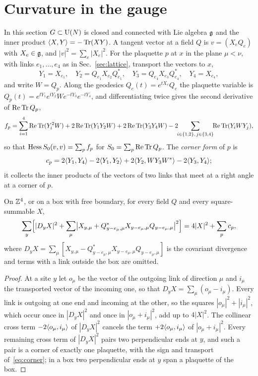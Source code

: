 \section{Curvature in the gauge}\label{sec:curvature}

In this section $G\subset\mathrm{U}(N)$ is closed and connected with Lie algebra $\mathfrak{g}$
and the inner product $\langle X,Y\rangle=-\operatorname{Tr}(XY)$. A tangent vector at a field $Q$ is
$v=(X_eQ_e)$ with $X_e\in\mathfrak{g}$, and $|v|^2=\sum_e|X_e|^2$. For the plaquette $p$
at $x$ in the plane $\mu<\nu$, with links $e_1,\dots,e_4$ as in
Sec.~\ref{sec:lattice}, transport the vectors to $x$,
\[
Y_1=X_{e_1},\quad Y_2=Q_{e_1}X_{e_2}Q_{e_1}^*,\quad
Y_3=Q_{e_4}X_{e_3}Q_{e_4}^*,\quad Y_4=X_{e_4},
\]
and write $W=Q_p$. Along the geodesics $Q_e(t)=e^{tX_e}Q_e$ the plaquette
variable is $Q_p(t)=e^{tY_1}e^{tY_2}We^{-tY_3}e^{-tY_4}$, and differentiating
twice gives the second derivative of $\operatorname{Re}\operatorname{Tr} Q_p$,
\begin{equation}\label{eq:fp}
f_p=\sum_{i=1}^4\operatorname{Re}\operatorname{Tr}(Y_i^2W)+2\operatorname{Re}\operatorname{Tr}(Y_1Y_2W)+2\operatorname{Re}\operatorname{Tr}(Y_3Y_4W)
-2\!\!\sum_{i\in\{1,2\},\,j\in\{3,4\}}\!\!\operatorname{Re}\operatorname{Tr}(Y_iWY_j),
\end{equation}
so that $\operatorname{Hess} S_0(v,v)=\sum_pf_p$ for $S_0=\sum_p\operatorname{Re}\operatorname{Tr} Q_p$. The
\emph{corner form} of $p$ is
\begin{equation}\label{eq:corner}
c_p=2\langle Y_1,Y_4\rangle-2\langle Y_1,Y_2\rangle+2\langle Y_2,WY_3W^*\rangle-2\langle Y_3,Y_4\rangle;
\end{equation}
it collects the inner products of the vectors of two links that meet at a
right angle at a corner of $p$.

\begin{lemma}\label{lem:identity}
On $\mathbb{Z}^4$, or on a box with free boundary, for every field $Q$ and every
square-summable $X$,
\[
\sum_y\Bigl[|D_yX|^2+\sum_\mu\bigl|X_{y,\mu}+Q^*_{y-e_\mu,\mu}X_{y-e_\mu,\mu}
Q_{y-e_\mu,\mu}\bigr|^2\Bigr]=4|X|^2+\sum_pc_p ,
\]
where $D_yX=\sum_\mu[X_{y,\mu}-Q^*_{y-e_\mu,\mu}X_{y-e_\mu,\mu}Q_{y-e_\mu,\mu}]$
is the covariant divergence and terms with a link outside the box are
omitted.
\end{lemma}

\begin{proof}
At a site $y$ let $o_\mu$ be the vector of the outgoing link of direction $\mu$
and $i_\mu$ the transported vector of the incoming one, so that $D_yX=\sum_\mu
(o_\mu-i_\mu)$. Every link is outgoing at one end and incoming at the other, so
the squares $|o_\mu|^2+|i_\mu|^2$, which occur once in $|D_yX|^2$ and once in
$|o_\mu+i_\mu|^2$, add up to $4|X|^2$. The collinear cross term
$-2\langle o_\mu,i_\mu\rangle$ of $|D_yX|^2$ cancels the term $+2\langle o_\mu,i_\mu\rangle$ of
$|o_\mu+i_\mu|^2$. Every remaining cross term of $|D_yX|^2$ pairs two
perpendicular ends at $y$, and such a pair is a corner of exactly one
plaquette, with the sign and transport of~\eqref{eq:corner}; in a box two
perpendicular ends at $y$ span a plaquette of the box.
\end{proof}

